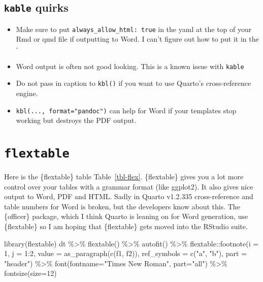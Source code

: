 \documentclass[
  letterpaper,
  oneside]{scrbook}
\newenvironment{Shaded}{\begin{snugshade}}{\end{snugshade}}
\newcommand{\AttributeTok}[1]{\textcolor[rgb]{0.40,0.45,0.13}{#1}}
\newcommand{\DecValTok}[1]{\textcolor[rgb]{0.68,0.00,0.00}{#1}}
\newcommand{\FunctionTok}[1]{\textcolor[rgb]{0.28,0.35,0.67}{#1}}
\newcommand{\NormalTok}[1]{\textcolor[rgb]{0.00,0.23,0.31}{#1}}
\newcommand{\SpecialCharTok}[1]{\textcolor[rgb]{0.37,0.37,0.37}{#1}}
\newcommand{\StringTok}[1]{\textcolor[rgb]{0.13,0.47,0.30}{#1}}
\providecommand{\tightlist}{%
  \setlength{\itemsep}{0pt}\setlength{\parskip}{0pt}}\usepackage{longtable,booktabs,array}
\begin{document}
\hypertarget{kable-quirks}{%
\subsection{\texorpdfstring{\texttt{kable}
quirks}{kable quirks}}\label{kable-quirks}}

\begin{itemize}
\tightlist
\item
  Make sure to put \texttt{always\_allow\_html:\ true} in the yaml at
  the top of your Rmd or qmd file if outputting to Word. I can't figure
  out how to put it in the `
\item
  Word output is often not good looking. This is a known issue with
  \texttt{kable}
\item
  Do not pass in caption to \texttt{kbl()} if you want to use Quarto's
  cross-reference engine.
\item
  \texttt{kbl(...,\ format="pandoc")} can help for Word if your
  templates stop working but destroys the PDF output.
\end{itemize}

\hypertarget{flextable}{%
\section{\texorpdfstring{\texttt{flextable}}{flextable}}\label{flextable}}

Here is the \{flextable\} table Table~\ref{tbl-flex}. \{flextable\}
gives you a lot more control over your tables with a grammar format
(like ggplot2). It also gives nice output to Word, PDF and HTML. Sadly
in Quarto v1.2.335 cross-reference and table numbers for Word is broken,
but the developers know about this. The \{officer\} package, which I
think Quarto is leaning on for Word generation, use \{flextable\} so I
am hoping that \{flextable\} gets moved into the RStudio suite.

\begin{Shaded}
\begin{Highlighting}[]
\FunctionTok{library}\NormalTok{(flextable)}
\NormalTok{dt }\SpecialCharTok{\%\textgreater{}\%}
  \FunctionTok{flextable}\NormalTok{() }\SpecialCharTok{\%\textgreater{}\%}
  \FunctionTok{autofit}\NormalTok{() }\SpecialCharTok{\%\textgreater{}\%}
\NormalTok{  flextable}\SpecialCharTok{::}\FunctionTok{footnote}\NormalTok{(}\AttributeTok{i =} \DecValTok{1}\NormalTok{, }\AttributeTok{j =} \DecValTok{1}\SpecialCharTok{:}\DecValTok{2}\NormalTok{,}
            \AttributeTok{value =} \FunctionTok{as\_paragraph}\NormalTok{(}\FunctionTok{c}\NormalTok{(f1, f2)),}
            \AttributeTok{ref\_symbols =} \FunctionTok{c}\NormalTok{(}\StringTok{"a"}\NormalTok{, }\StringTok{"b"}\NormalTok{),}
            \AttributeTok{part =} \StringTok{"header"}\NormalTok{) }\SpecialCharTok{\%\textgreater{}\%}
  \FunctionTok{font}\NormalTok{(}\AttributeTok{fontname=}\StringTok{"Times New Roman"}\NormalTok{, }\AttributeTok{part=}\StringTok{"all"}\NormalTok{) }\SpecialCharTok{\%\textgreater{}\%}
  \FunctionTok{fontsize}\NormalTok{(}\AttributeTok{size=}\DecValTok{12}\NormalTok{)}
\end{Highlighting}
\end{Shaded}
\end{document}

